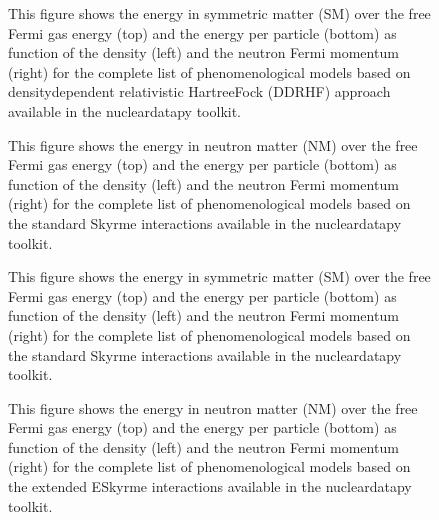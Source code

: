 \documentclass[letterpaper,10pt,english]{sphinxmanual}
\begin{document}
\begin{figure}[htbp]
\centering
\capstart

\noindent{}
\caption{This figure shows the energy in symmetric matter (SM) over the free Fermi gas energy (top) and the energy per particle (bottom) as function of the density (left) and the neutron Fermi momentum (right) for the complete list of phenomenological models based on density\sphinxhyphen{}dependent relativistic Hartree\sphinxhyphen{}Fock (DDRHF) approach available in the nucleardatapy toolkit.}\label{\detokenize{source/api/setup_matter_pheno:id6}}\end{figure}

\begin{figure}[htbp]
\centering
\capstart

\noindent{}
\caption{This figure shows the energy in neutron matter (NM) over the free Fermi gas energy (top) and the energy per particle (bottom) as function of the density (left) and the neutron Fermi momentum (right) for the complete list of phenomenological models based on the standard Skyrme interactions available in the nucleardatapy toolkit.}\label{\detokenize{source/api/setup_matter_pheno:id7}}\end{figure}

\begin{figure}[htbp]
\centering
\capstart

\noindent{}
\caption{This figure shows the energy in symmetric matter (SM) over the free Fermi gas energy (top) and the energy per particle (bottom) as function of the density (left) and the neutron Fermi momentum (right) for the complete list of phenomenological models based on the standard Skyrme interactions available in the nucleardatapy toolkit.}\label{\detokenize{source/api/setup_matter_pheno:id8}}\end{figure}

\begin{figure}[htbp]
\centering
\capstart

\noindent{}
\caption{This figure shows the energy in neutron matter (NM) over the free Fermi gas energy (top) and the energy per particle (bottom) as function of the density (left) and the neutron Fermi momentum (right) for the complete list of phenomenological models based on the extended ESkyrme interactions available in the nucleardatapy toolkit.}\label{\detokenize{source/api/setup_matter_pheno:id9}}\end{figure}
\end{document}
